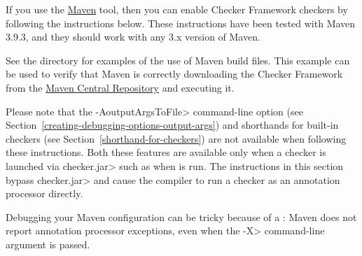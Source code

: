 
If you use the \href{https://maven.apache.org/}{Maven} tool,
then you can enable Checker Framework checkers by following the
instructions below.  These instructions have been tested with
Maven 3.9.3, and they should work with any 3.x version of Maven.

See the directory  for examples of the use of
Maven build files.
This example can be used to verify that
Maven is correctly downloading the Checker Framework from the
\href{https://central.sonatype.com/search?q=io.github.eisop}{Maven
  Central Repository} and executing it.

Please note that the \<-AoutputArgsToFile> command-line option
(see Section~\ref{creating-debugging-options-output-args}) and shorthands for built-in checkers
(see Section~\ref{shorthand-for-checkers}) are not available when
following these instructions.  Both these features are available only when a checker is
launched via \<checker.jar> such as when 
is run.  The instructions in this section
bypass \<checker.jar> and cause the compiler to run a
checker as an annotation processor directly.

Debugging your Maven configuration can be tricky because of a
: Maven does not report
annotation processor exceptions, even when
the \<-X> command-line argument is passed.


